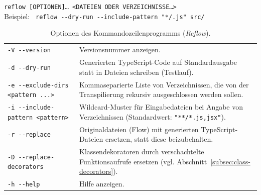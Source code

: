 {{
  \small
  \texttt{reflow [OPTIONEN]… <DATEIEN ODER VERZEICHNISSE…>}\\
  Beispiel: \texttt{ reflow -{}-dry-run -{}-include-pattern "{}*/.js"{} src/}
}

\begin{table}[tbh]
  \small
  \begin{tabu} to  %
    \midrule
     &  \\
    \midrule
    \medskip
    \texttt{-V -{}-version} & Versionsnummer anzeigen. \\
    \medskip
    \texttt{-d -{}-dry-run} & Generierten TypeScript-Code auf Standardausgabe statt in Dateien schreiben (Testlauf).\\
    \medskip
    \texttt{-e -{}-exclude-dirs <pattern ...>} & Kommaseparierte Liste von Verzeichnissen, die von der Transpilierung rekursiv ausgeschlossen werden sollen. \\
    \medskip
    \texttt{-i -{}-include-pattern <pattern>} & Wildcard-Muster für Eingabedateien bei Angabe von Verzeichnissen (Standardwert: \texttt{"**/*.{js,jsx}"}). \\
    \medskip
    \texttt{-r -{}-replace} & Originaldateien (Flow) mit generierten TypeScript-Dateien ersetzen, statt diese beizubehalten. \\
    \medskip
    \texttt{-D -{}-replace-decorators} & Klassendekoratoren durch verschachtelte Funktionsaufrufe ersetzen (vgl. Abschnitt~\ref{subsec:class-decorators}). \\
    \medskip
    \texttt{-h -{}-help} & Hilfe anzeigen. \\
    \midrule
  \end{tabu}
  \caption{Optionen des Kommandozeilenprogramms (\textit{Reflow}).}
  \label{tab:cli-options}
\end{table}

}
